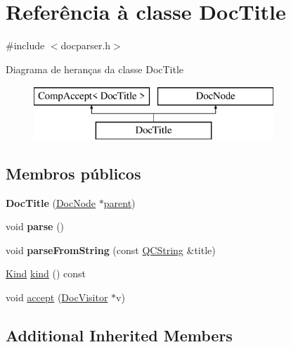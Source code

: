 \hypertarget{class_doc_title}{\section{Referência à classe Doc\-Title}
\label{class_doc_title}
}


{\ttfamily \#include $<$docparser.\-h$>$}

Diagrama de heranças da classe Doc\-Title\begin{figure}[H]
\begin{center}
\leavevmode
\includegraphics[height=2.000000cm]{class_doc_title}
\end{center}
\end{figure}
\subsection*{Membros públicos}
\begin{DoxyCompactItemize}
\item 
\hypertarget{class_doc_title_acf791290e5e5ce49558bc638d07a88c2}{{\bfseries Doc\-Title} (\hyperlink{class_doc_node}{Doc\-Node} $\ast$\hyperlink{class_doc_node_abd7f070d6b0a38b4da71c2806578d19d}{parent})}\label{class_doc_title_acf791290e5e5ce49558bc638d07a88c2}

\item 
\hypertarget{class_doc_title_ad7c704b34912678d95c13243cacf9d7f}{void {\bfseries parse} ()}\label{class_doc_title_ad7c704b34912678d95c13243cacf9d7f}

\item 
\hypertarget{class_doc_title_a18dbba533de86937f3bcbed9f17330f2}{void {\bfseries parse\-From\-String} (const \hyperlink{class_q_c_string}{Q\-C\-String} \&title)}\label{class_doc_title_a18dbba533de86937f3bcbed9f17330f2}

\item 
\hyperlink{class_doc_node_aa10c9e8951b8ccf714a59ec321bdac5b}{Kind} \hyperlink{class_doc_title_aa9d037bed9f9a083d0cd01485637d843}{kind} () const 
\item 
void \hyperlink{class_doc_title_a7ba716e854ae2f8f87a4eb2140e302b6}{accept} (\hyperlink{class_doc_visitor}{Doc\-Visitor} $\ast$v)
\end{DoxyCompactItemize}
\subsection*{Additional Inherited Members}


